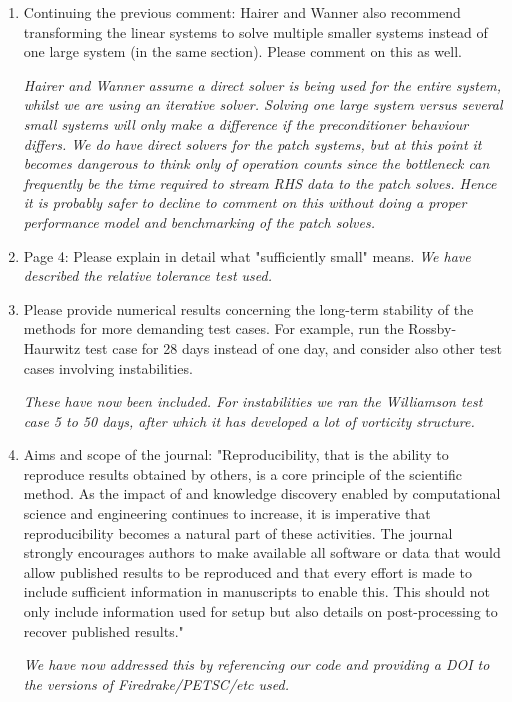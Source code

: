 \documentclass[a4paper,12pt]{article}
\begin{document}
\begin{enumerate}
{  We made a preliminary investigation of the stage values formulation,
  since this option is easily available in Irksome. However, we
  obtained linear solver divergences on the second Newton iteration
  for the largest timestep considered (7200s), which suggests that a
  better initial guess is needed at large timesteps (we used the value
  of the solution at the start of the timestep for all stages). We did
  not encounter this problem for stage derivatives, even for larger values
  not presented in the manuscript. For smaller values there is no difference
  in performance or error for stage values, so this does not seem to be
  an important aspect.}
\item  Continuing the previous comment: Hairer and Wanner also recommend transforming the linear systems to solve multiple smaller systems instead of one large system (in the same section). Please comment on this as well.

  \emph{Hairer and Wanner assume a direct solver is being used for the
  entire system, whilst we are using an iterative solver. Solving one
  large system versus several small systems will only make a
  difference if the preconditioner behaviour differs. We do have
  direct solvers for the patch systems, but at this point it becomes
  dangerous to think only of operation counts since the bottleneck can
  frequently be the time required to stream RHS data to the patch
  solves.  Hence it is probably safer to decline to comment on this
  without doing a proper performance model and benchmarking of the
  patch solves.  }
  
\item  Page 4: Please explain in detail what "sufficiently small" means.
  \emph{We have described the relative tolerance test used.}
  
\item Please provide numerical results concerning the long-term
  stability of the methods for more demanding test cases. For example,
  run the Rossby-Haurwitz test case for 28 days instead of one day,
  and consider also other test cases involving instabilities.

\emph{These have now been included. For instabilities we ran the
Williamson test case 5 to 50 days, after which it has developed a lot of
vorticity structure.}
  
\item  Aims and scope of the journal: "Reproducibility, that is the ability to reproduce results obtained by others, is a core principle of the scientific method. As the impact of and knowledge discovery enabled by computational science and engineering continues to increase, it is imperative that reproducibility becomes a natural part of these activities. The journal strongly encourages authors to make available all software or data that would allow published results to be reproduced and that every effort is made to include sufficient information in manuscripts to enable this. This should not only include information used for setup but also details on post-processing to recover published results."

\emph{We have now addressed this by referencing our code and providing a DOI
  to the versions of Firedrake/PETSC/etc used.}
\end{enumerate}
\end{document}
